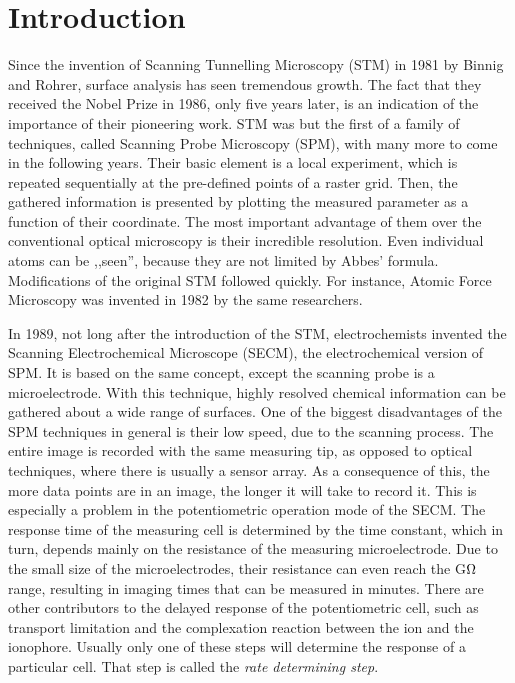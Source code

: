 \chapter{Introduction}
\pagestyle{headings}
Since the invention of Scanning Tunnelling Microscopy (STM) in 1981 by Binnig and Rohrer, surface analysis has seen tremendous growth.
The fact that they received the Nobel Prize in 1986, only five years later, is an indication of the importance of their pioneering work.
STM was but the first of a family of techniques, called Scanning Probe Microscopy (SPM), with many more to come in the following years.
Their basic element is a local experiment, which is repeated sequentially at the pre-defined points of a raster grid.
Then, the gathered information is presented by plotting the measured parameter as a function of their coordinate.
The most important advantage of them over the conventional optical microscopy is their incredible resolution.
Even individual atoms can be ,,seen'', because they are not limited by Abbes' formula.
Modifications of the original STM followed quickly.
For instance, Atomic Force Microscopy was invented in 1982 by the same researchers.

In 1989, not long after the introduction of the STM, electrochemists invented the Scanning Electrochemical Microscope (SECM), the electrochemical version of SPM.
It is based on the same concept, except the scanning probe is a microelectrode.
With this technique, highly resolved chemical information can be gathered about a wide range of surfaces.
One of the biggest disadvantages of the SPM techniques in general is their low speed, due to the scanning process.
The entire image is recorded with the same measuring tip, as opposed to optical techniques, where there is usually a sensor array.
As a consequence of this, the more data points are in an image, the longer it will take to record it.
This is especially a problem in the potentiometric operation mode of the SECM.
The response time of the measuring cell is determined by the time constant, which in turn, depends mainly on the resistance of the measuring microelectrode.
Due to the small size of the microelectrodes, their resistance can even reach the G$\ohm$ range, resulting in imaging times that can be measured in minutes.
There are other contributors to the delayed response of the potentiometric cell, such as transport limitation and the complexation reaction between the ion and the ionophore.
Usually only one of these steps will determine the response of a particular cell.
That step is called the \emph{rate determining step}.

